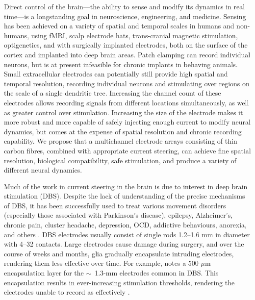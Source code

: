 \documentclass[10pt,letterpaper]{article}
\begin{document}
Direct control of the brain---the ability to sense and modify its
dynamics in real time---is a longstanding goal in neuroscience,
engineering, and medicine. Sensing has been achieved on a variety of
spatial and temporal scales in humans and non-humans, using fMRI,
scalp electrode hats, trans-cranial magnetic stimulation,
optigenetics, and with surgically implanted electrodes, both on the
surface of the cortex and implanted into deep brain areas. Patch
clamping can record individual neurons, but is at present infeasible
for chronic implants in behaving animals. Small extracellular
electrodes can potentially still provide high spatial and temporal
resolution, recording individual neurons and stimulating over regions
on the scale of a single dendritic tree. Increasing the channel count
of these electrodes allows recording signals from different locations
simultaneously, as well as greater control over
stimulation. Increasing the size of the electrode makes it more robust
and more capable of safely injecting enough current to modify neural
dynamics, but comes at the expense of spatial resolution and chronic
recording capability. We propose that a multichannel electrode arrays
consisting of thin carbon fibres, combined with appropriate current
steering, can achieve fine spatial resolution, biological
compatibility, safe stimulation, and produce a variety of different
neural dynamics.

Much of the work in current steering in the brain is due to interest
in deep brain stimulation (DBS).  Despite the lack of understanding of
the precise mechanisms of DBS, it has been successfully used to treat
various movement disorders (especially those associated with
Parkinson's disease), epilepsy, Alzheimer's, chronic pain, cluster
headache, depression, OCD, addictive behaviours, anorexia, and others
\cite{Udupa2015dbs}. DBS electrodes usually consist of single rods
1.2--1.6 mm in diameter with 4--32 contacts. Large electrodes cause
damage during surgery, and over the course of weeks and months, glia
gradually encapsulate intruding electrodes, rendering them less
effective over time. For example, \cite{Butson2008steering} notes a
500-$\mu$m encapsulation layer for the $\sim$~1.3-mm electrodes common
in DBS.  This encapsulation results in ever-increasing stimulation
thresholds, rendering the electrodes unable to record as effectively
\cite{Barrese2016electrodestability,Biran2005gliosis,Polikov2005gliosis,Winslow2010gliosis}.
\end{document}
